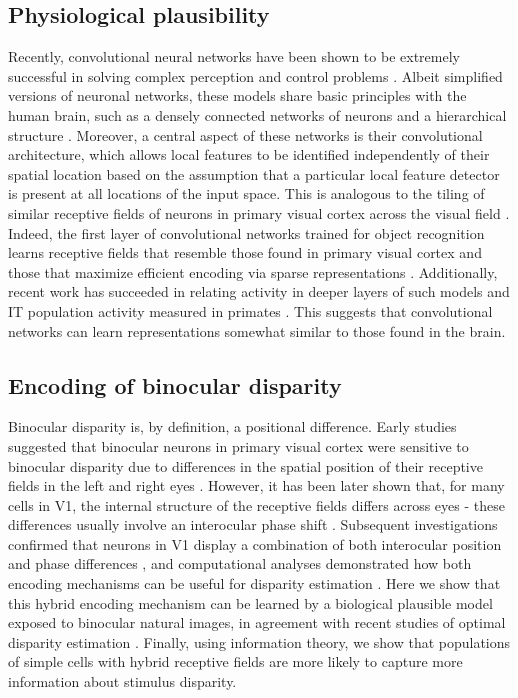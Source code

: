 \subsection{Physiological plausibility}
Recently, convolutional neural networks have been shown to be extremely successful in solving complex perception and control problems \cite{LeCun:2015ez}. Albeit simplified versions of neuronal networks, these models share basic principles with the human brain, such as a densely connected networks of neurons and a hierarchical structure \cite{Felleman:1991kg}. Moreover, a central aspect of these networks is their convolutional architecture, which allows local features to be identified independently of their spatial location based on the assumption that a particular local feature detector is present at all locations of the input space. This is analogous to the tiling of similar receptive fields of neurons in primary visual cortex across the visual field \cite{HUBEL:1962ti}. Indeed, the first layer of convolutional networks trained for object recognition learns receptive fields that resemble those found in primary visual cortex \cite{NIPS2012_4824} and those that maximize efficient encoding via sparse representations \cite{Olshausen:1996dt}. Additionally, recent work has succeeded in relating activity in deeper layers of such models and IT population activity measured in primates \cite{Yamins:2014tc,Cadieu:2014fk,Khaligh-Razavi:2014yr,Yamins:2016bh}. This suggests that convolutional networks can learn representations somewhat similar to those found in the brain.


\subsection{Encoding of binocular disparity}
Binocular disparity is, by definition, a positional difference. Early studies suggested that binocular neurons in primary visual cortex were sensitive to binocular disparity due to differences in the spatial position of their receptive fields in the left and right eyes \cite{Barlow:1967bs,Poggio:1977ys}. However, it has been later shown that, for many cells in V1, the internal structure of the receptive fields differs across eyes - these differences usually involve an interocular phase shift \cite{DeAngelis:1991mb,Ohzawa:1996bs}. Subsequent investigations confirmed that neurons in V1 display a combination of both interocular position and phase differences \cite{Prince:2002uq,Tsao:2003pi}, and computational analyses demonstrated how both encoding mechanisms can be useful for disparity estimation \cite{Fleet1996,Read:2007nx}. Here we show that this hybrid encoding mechanism can be learned by a biological plausible model exposed to binocular natural images, in agreement with recent studies of optimal disparity estimation \cite{Burge:2014qj}. Finally, using information theory, we show that populations of simple cells with hybrid receptive fields are more likely to capture more information about stimulus disparity.

